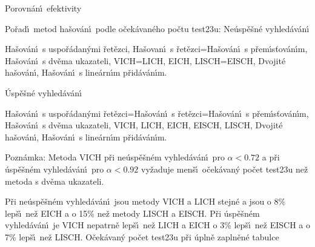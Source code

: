 \heading
Porovn\'an\'\i\ efektivity
\endheading

\flushpar Po\v rad\'\i\ metod ha\v sov\'an\'\i\ podle o\v cek\'avan\'eho po\v ctu 
test\accent23u:
\subhead
Ne\'usp\v e\v sn\'e vyhled\'av\'an\'\i
\endsubhead 

\phantom{---}Ha\v sov\'an\'\i\ s uspo\v r\'adan\'ymi \v ret\v ezci,\newline 
\phantom{---}Ha\v sovan\'\i\ s \v ret\v ezci=Ha\v sov\'an\'\i\ s p\v rem\'\i s\v tov\'an\'\i m,\newline 
\phantom{---}Ha\v sov\'an\'\i\ s dv\v ema ukazateli,\newline 
\phantom{---}VICH=LICH,\newline 
\phantom{---}EICH,\newline 
\phantom{---}LISCH=EISCH,\newline 
\phantom{---}Dvojit\'e ha\v sov\'an\'\i ,\newline 
\phantom{---}Ha\v sov\'an\'\i\ s line\'arn\'\i m p\v rid\'av\'an\'\i m.
\medskip

\subhead
\'Usp\v e\v sn\'e vyhled\'av\'an\'\i 
\endsubhead

\phantom{---}Ha\v sov\'an\'\i\ s uspo\v r\'adan\'ymi \v ret\v ezci=Ha\v sov\'an\'\i\ s 
\v ret\v ezci=Ha\v so\-v\'a\-n\'\i\ s p\v rem\'\i s\v tov\'an\'\i m,\newline 
\phantom{---}Ha\v sov\'an\'\i\ s dv\v ema ukazateli,\newline 
\phantom{---}VICH,\newline 
\phantom{---}LICH,\newline 
\phantom{---}EICH,\newline 
\phantom{---}EISCH,\newline 
\phantom{---}LISCH,\newline 
\phantom{---}Dvojit\'e ha\v sov\'an\'\i ,\newline 
\phantom{---}Ha\v sov\'an\'\i\ s line\'arn\'\i m p\v rid\'av\'an\'\i m.
\medskip

\flushpar Pozn\'amka: Metoda VICH p\v ri ne\'usp\v e\v sn\'em vyhled\'av\'an\'\i\ pro 
$\alpha <0.72$ a p\v ri \'usp\v e\v sn\'em vy\-hled\'av\'an\'\i\ pro $
\alpha <0.92$ 
vy\v zaduje men\v s\'\i\ o\v cek\'avan\'y po\v cet test\accent23u ne\v z 
metoda s dv\v ema ukazateli.

\flushpar P\v ri ne\'usp\v e\v sn\'em vyhled\'av\'an\'\i\ jsou metody VICH a LICH stejn\'e a jsou o 8\% lep\v s\'\i\ ne\v z 
EICH a o 15\% ne\v z metody LISCH a EISCH. P\v ri \'usp\v e\v sn\'em vyhled\'av\'an\'\i\ 
je VICH nepatrn\v e lep\v s\'\i\ ne\v z LICH a EICH o 3\% lep\v s\'\i\ ne\v z 
EISCH a o 7\% lep\v s\'\i\ ne\v z LISCH.
\medskip
\subhead
O\v cek\'avan\'y po\v cet test\accent23u p\v ri \'upln\v e zapln\v en\'e 
tabulce
\endsubhead 

